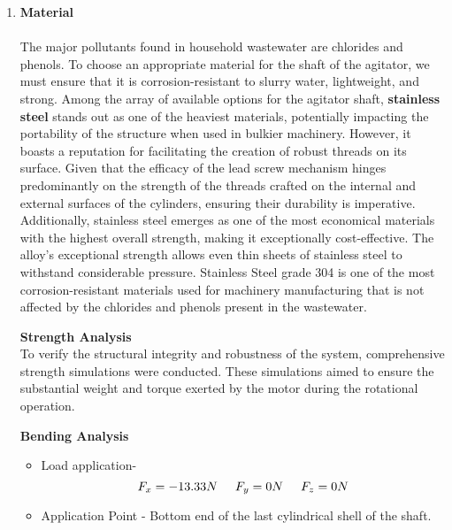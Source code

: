 \documentclass[a4,10pt]{report}
\begin{document}
\begin{enumerate}
\item \textbf{Material} \\ \\The major pollutants found in household wastewater are chlorides and phenols.\cite{toxic_compounds} To choose an appropriate material for the shaft of the agitator, we must ensure that it is corrosion-resistant to slurry water, lightweight, and strong. Among the array of available options for the agitator shaft, \textbf{stainless steel} stands out as one of the heaviest materials, potentially impacting the portability of the structure when used in bulkier machinery. However, it boasts a reputation for facilitating the creation of robust threads on its surface. Given that the efficacy of the lead screw mechanism hinges predominantly on the strength of the threads crafted on the internal and external surfaces of the cylinders, ensuring their durability is imperative. 
\vspace{2mm} \\
Additionally, stainless steel emerges as one of the most economical materials with the highest overall strength, making it exceptionally cost-effective. The alloy's exceptional strength allows even thin sheets of stainless steel to withstand considerable pressure. Stainless Steel grade 304 is one of the most corrosion-resistant materials used for machinery manufacturing that is not affected by the chlorides and phenols present in the wastewater.



\textbf{Strength Analysis} \\
To verify the structural integrity and robustness of the system, comprehensive strength simulations were conducted. These simulations aimed to ensure the substantial weight and torque exerted by the motor during the rotational operation. \\ 


\par 


\textbf{Bending Analysis}

\begin{itemize}
 \item Load application-
 \[ F_{x} = -13.33  N  \hspace{0.5cm} F_{y} = 0 N \hspace{0.5cm} F_{z} = 0 N \]

\item Application Point - Bottom end of the last cylindrical shell of the shaft.


\end{itemize}
\end{enumerate}
\end{document}
